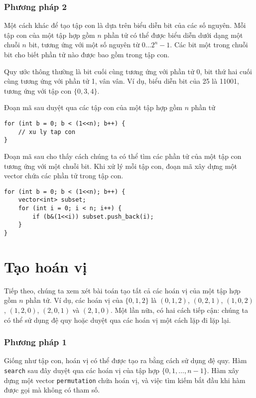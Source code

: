 \subsubsection{Phương pháp 2}

Một cách khác để tạo tập con là dựa trên
biểu diễn bit của các số nguyên.
Mỗi tập con của một tập hợp gồm $n$ phần tử
có thể được biểu diễn dưới dạng một chuỗi $n$ bit,
tương ứng với một số nguyên từ $0 \ldots 2^n-1$.
Các bit một trong chuỗi bit cho biết
phần tử nào được bao gồm trong tập con.

Quy ước thông thường là
bit cuối cùng tương ứng với phần tử 0,
bit thứ hai cuối cùng tương ứng với phần tử 1,
vân vân.
Ví dụ, biểu diễn bit của 25 là 11001,
tương ứng với tập con $\{0,3,4\}$.

Đoạn mã sau duyệt qua các tập con
của một tập hợp gồm $n$ phần tử

\begin{lstlisting}
for (int b = 0; b < (1<<n); b++) {
    // xu ly tap con
}
\end{lstlisting}

Đoạn mã sau cho thấy cách chúng ta có thể tìm
các phần tử của một tập con tương ứng với một chuỗi bit.
Khi xử lý mỗi tập con,
đoạn mã xây dựng một vector chứa các
phần tử trong tập con.

\begin{lstlisting}
for (int b = 0; b < (1<<n); b++) {
    vector<int> subset;
    for (int i = 0; i < n; i++) {
        if (b&(1<<i)) subset.push_back(i);
    }
}
\end{lstlisting}

\section{Tạo hoán vị}


Tiếp theo, chúng ta xem xét bài toán tạo
tất cả các hoán vị của một tập hợp gồm $n$ phần tử.
Ví dụ, các hoán vị của $\{0,1,2\}$ là
$(0,1,2)$, $(0,2,1)$, $(1,0,2)$, $(1,2,0)$,
$(2,0,1)$ và $(2,1,0)$.
Một lần nữa, có hai cách tiếp cận:
chúng ta có thể sử dụng đệ quy hoặc duyệt qua các
hoán vị một cách lặp đi lặp lại.

\subsubsection{Phương pháp 1}

Giống như tập con, hoán vị có thể được tạo ra
bằng cách sử dụng đệ quy.
Hàm \texttt{search} sau đây duyệt qua
các hoán vị của tập hợp $\{0,1,\ldots,n-1\}$.
Hàm xây dựng một vector \texttt{permutation}
chứa hoán vị,
và việc tìm kiếm bắt đầu khi hàm được
gọi mà không có tham số.

